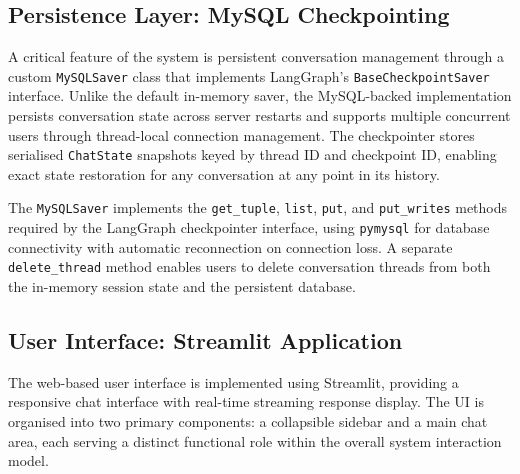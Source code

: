 \documentclass[12pt,a4paper]{article}
\begin{document}
\subsection{Persistence Layer: MySQL Checkpointing}
\label{subsec:persistence}

A critical feature of the system is persistent conversation management through a custom \texttt{MySQLSaver} class that implements LangGraph's \texttt{BaseCheckpointSaver} interface. Unlike the default in-memory saver, the MySQL-backed implementation persists conversation state across server restarts and supports multiple concurrent users through thread-local connection management. The checkpointer stores serialised \texttt{ChatState} snapshots keyed by thread ID and checkpoint ID, enabling exact state restoration for any conversation at any point in its history.

The \texttt{MySQLSaver} implements the \texttt{get\_tuple}, \texttt{list}, \texttt{put}, and \texttt{put\_writes} methods required by the LangGraph checkpointer interface, using \texttt{pymysql} for database connectivity with automatic reconnection on connection loss. A separate \texttt{delete\_thread} method enables users to delete conversation threads from both the in-memory session state and the persistent database.


\subsection{User Interface: Streamlit Application}
\label{subsec:ui}

The web-based user interface is implemented using Streamlit, providing a responsive chat interface with real-time streaming response display. The UI is organised into two primary components: a collapsible sidebar and a main chat area, each serving a distinct functional role within the overall system interaction model.
\end{document}
